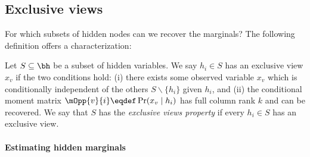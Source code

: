 \subsection{Exclusive views}
\label{sec:general}

For which subsets of hidden nodes can we recover the marginals?  The following
definition offers a characterization:
\begin{definition}
  \label{def:exclusive-views}
Let $S \subseteq \bh$ be a subset of hidden variables.
We say $h_i \in S$ has an exclusive view $x_v$
  if the two conditions hold:
  (i) there exists some observed variable
  $x_{v}$ which is conditionally independent of the others $S \backslash \{ h_i \}$ given $h_i$,
  and (ii) the conditional moment matrix $\mOpp{v}{i} \eqdef
  \Pr(x_{v} \mid h_i)$ has full column rank $k$ and can be recovered.
We say that $S$ has the \emph{exclusive views property} if every $h_i \in S$ has an exclusive view.
\end{definition}

\paragraph{Estimating hidden marginals}

